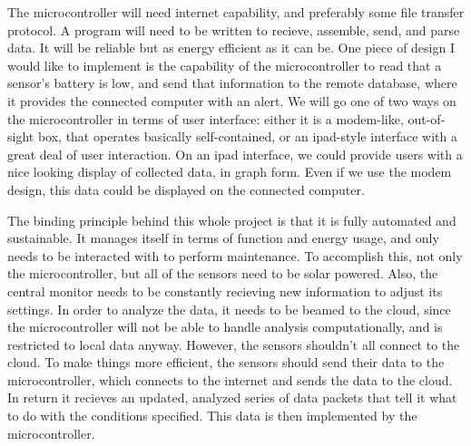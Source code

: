 \documentclass[letterpaper, 10pt, fleqn]{article}
\begin{document}
	The microcontroller will need internet capability, and preferably some file transfer protocol. A program will need to be written to recieve, assemble, send, and parse data. It will be reliable but as energy efficient as it can be. One piece of design I would like to implement is the capability of the microcontroller to read that a sensor's battery is low, and send that information to the remote database, where it provides the connected computer with an alert. We will go one of two ways on the microcontroller in terms of user interface: either it is a modem-like, out-of-sight box, that operates basically self-contained, or an ipad-style interface with a great deal of user interaction. On an ipad interface, we could provide users with a nice looking display of collected data, in graph form. Even if we use the modem design, this data could be displayed on the connected computer.  

	The binding principle behind this whole project is that it is fully automated and sustainable. It manages itself in terms of function and energy usage, and only needs to be interacted with to perform maintenance. To accomplish this, not only the microcontroller, but all of the sensors need to be solar powered. Also, the central monitor needs to be constantly recieving new information to adjust its settings. In order to analyze the data, it needs to be beamed to the cloud, since the microcontroller will not be able to handle analysis computationally, and is restricted to local data anyway. However, the sensors shouldn't all connect to the cloud. To make things more efficient, the sensors should send their data to the microcontroller, which connects to the internet and sends the data to the cloud. In return it recieves an updated, analyzed series of data packets that tell it what to do with the conditions specified. This data is then implemented by the microcontroller. 
\end{document}
